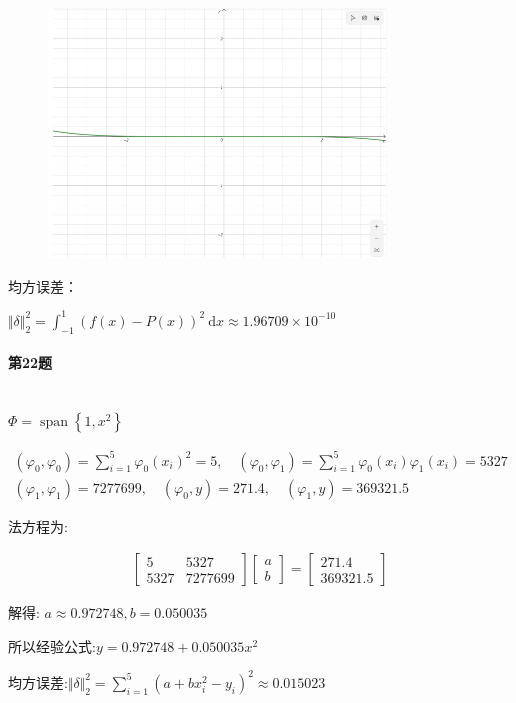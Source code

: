 \documentclass[a4paper]{article}
\begin{document}
\begin{figure}[h]
    \centering
    \includegraphics[width=0.8\textwidth]{hw2_20.png}\\
    \end{figure}
\par
均方误差：\par
$\Vert\delta\Vert_2^2 = \int_{-1}^{1}(f(x)-P(x))^{2} \mathrm{~d} x \approx 1.96709 \times 10^{-10}$
\paragraph{第22题}~{}
\\

$\Phi=\operatorname{span}\left\{1, x^{2}\right\}$ \par
\[
    \begin{array}{c}\left(\varphi_{0}, \varphi_{0}\right)=\sum\limits_{i=1}^{5} \varphi_{0}\left(x_{i}\right)^{2}=5, \quad\left(\varphi_{0}, \varphi_{1}\right)=\sum\limits_{i=1}^{5} \varphi_{0}\left(x_{i}\right) \varphi_{1}\left(x_{i}\right)=5327 \\ \left(\varphi_{1}, \varphi_{1}\right)=7277699, \quad\left(\varphi_{0}, y\right)=271.4, \quad\left(\varphi_{1}, y\right)=369321.5\end{array}    
\]\par
法方程为:\par
\begin{eqnarray}
    \left[\begin{array}{cc}5 & 5327 \\ 5327 & 7277699\end{array}\right]\left[\begin{array}{l}a \\ b\end{array}\right]=\left[\begin{array}{c}271.4 \\ 369321.5\end{array}\right]
\end{eqnarray}\par
解得: $a \approx 0.972748, b=0.050035$\par
所以经验公式:$y=0.972748+0.050035 x^{2}$\par
均方误差:$\Vert\delta\Vert_2^2=\sum_{i=1}^{5}\left(a+b x_{i}^{2}-y_{i}\right)^{2} \approx 0.015023$
\end{document}
